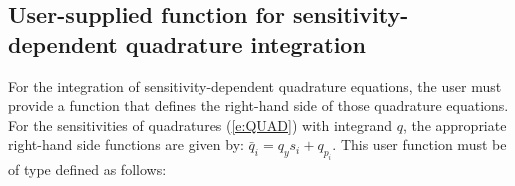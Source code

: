 
\subsection{User-supplied function for sensitivity-dependent quadrature integration}
\label{ss:user_fct_quad_sens}


For the integration of sensitivity-dependent quadrature equations, the
user must provide a function that defines the right-hand side of those
quadrature equations.  For the sensitivities of quadratures (\ref{e:QUAD}) with
integrand $q$, the appropriate right-hand side functions are given by:
$\bar{q}_i = q_y s_i + q_{p_i}$.
This user function must be of type  defined as follows:

